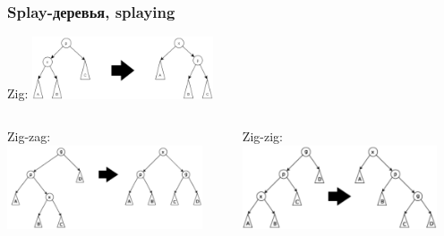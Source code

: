 \documentclass[xetex,mathserif,serif]{beamer}
\begin{document}
	\begin{frame}
		\frametitle{Splay-деревья, splaying}
		Zig:\newline
		\includegraphics[width=0.4\textwidth]{splayZig.png}
		\vspace{5mm}
		\begin{columns}
			\begin{column}{0.5\textwidth}
				Zig-zag:\newline
				\includegraphics[width=0.9\textwidth]{splayZigZag.png}
			\end{column}
			\begin{column}{0.5\textwidth}
				Zig-zig:\newline
				\includegraphics[width=0.9\textwidth]{splayZigZig.png}
			\end{column}
		\end{columns}
	\end{frame}
\end{document}
